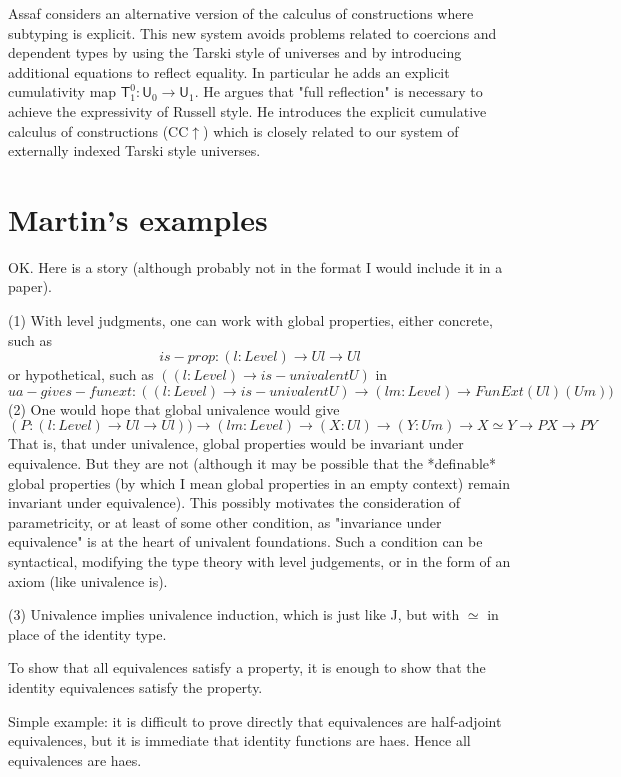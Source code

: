 \documentclass[11pt,a4paper]{article}
\def\UU{\mathsf{U}}
\newcommand{\T}{\mathsf{T}}
\begin{document}
Assaf \cite{Assaf14} considers an alternative version of the calculus of
constructions where subtyping is explicit. This new system avoids problems related to coercions and dependent types by using the Tarski style
of universes and by introducing additional equations to reflect equality. In particular he adds an explicit cumulativity map $\T^0_1 : \UU_0 \to \UU_1$. He argues that "full reflection" is necessary to achieve the expressivity of Russell style. He introduces the explicit cumulative calculus of constructions (CC$\uparrow$) which is closely related to our system of externally indexed Tarski style universes.

\section{Martin's examples}
OK. Here is a story (although probably not in the format I would include 
it in a paper).

(1) With level judgments, one can work with global properties, either 
concrete, such as
$$
     is-prop : (l : Level) → U l → U l
$$
or hypothetical, such as $((l : Level) → is-univalent U)$ in
$$
     ua-gives-funext : ((l : Level) → is-univalent U)
                     → (l m : Level) → FunExt (U l) (U m))
$$
(2) One would hope that global univalence would give
$$
       (P : (l : Level) → U l → U l))
     → (l m : Level)
     → (X : U l)
     → (Y : U m)
     → X ≃ Y
     → P X
     → P Y
$$
That is, that under univalence, global properties would be invariant
under equivalence. But they are not (although it may be possible that
the *definable* global properties (by which I mean global properties
in an empty context) remain invariant under equivalence). This
possibly motivates the consideration of parametricity, or at least of
some other condition, as "invariance under equivalence" is at the
heart of univalent foundations. Such a condition can be syntactical,
modifying the type theory with level judgements, or in the form of an
axiom (like univalence is).

(3) Univalence implies univalence induction, which is just like J, but
     with $\simeq$ in place of the identity type.

     To show that all equivalences satisfy a property, it is enough to
     show that the identity equivalences satisfy the property.

     Simple example: it is difficult to prove directly that
     equivalences are half-adjoint equivalences, but it is immediate
     that identity functions are haes. Hence all equivalences are haes.
\end{document}
